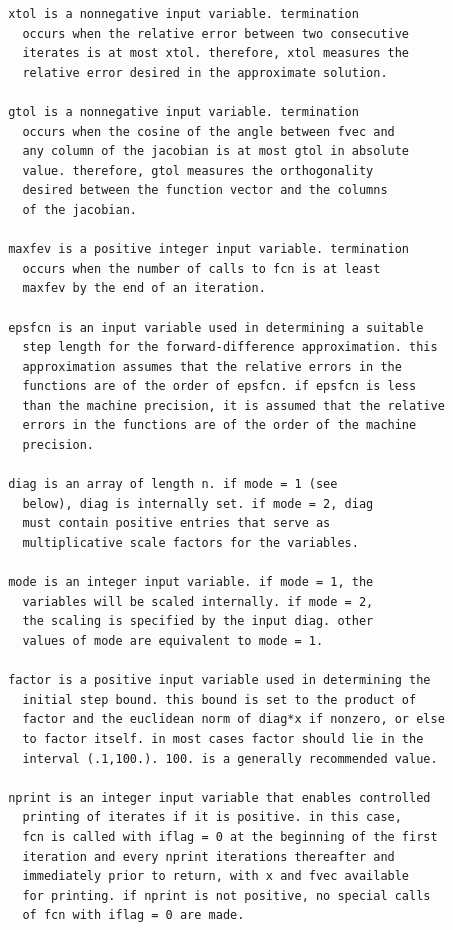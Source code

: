 \documentclass[11pt,twoside]{article}
\begin{document}
\begin{verbatim}
       xtol is a nonnegative input variable. termination
         occurs when the relative error between two consecutive
         iterates is at most xtol. therefore, xtol measures the
         relative error desired in the approximate solution.

       gtol is a nonnegative input variable. termination
         occurs when the cosine of the angle between fvec and
         any column of the jacobian is at most gtol in absolute
         value. therefore, gtol measures the orthogonality
         desired between the function vector and the columns
         of the jacobian.

       maxfev is a positive integer input variable. termination
         occurs when the number of calls to fcn is at least
         maxfev by the end of an iteration.

       epsfcn is an input variable used in determining a suitable
         step length for the forward-difference approximation. this
         approximation assumes that the relative errors in the
         functions are of the order of epsfcn. if epsfcn is less
         than the machine precision, it is assumed that the relative
         errors in the functions are of the order of the machine
         precision.

       diag is an array of length n. if mode = 1 (see
         below), diag is internally set. if mode = 2, diag
         must contain positive entries that serve as
         multiplicative scale factors for the variables.

       mode is an integer input variable. if mode = 1, the
         variables will be scaled internally. if mode = 2,
         the scaling is specified by the input diag. other
         values of mode are equivalent to mode = 1.

       factor is a positive input variable used in determining the
         initial step bound. this bound is set to the product of
         factor and the euclidean norm of diag*x if nonzero, or else
         to factor itself. in most cases factor should lie in the
         interval (.1,100.). 100. is a generally recommended value.

       nprint is an integer input variable that enables controlled
         printing of iterates if it is positive. in this case,
         fcn is called with iflag = 0 at the beginning of the first
         iteration and every nprint iterations thereafter and
         immediately prior to return, with x and fvec available
         for printing. if nprint is not positive, no special calls
         of fcn with iflag = 0 are made.


\end{verbatim}
\end{document}
